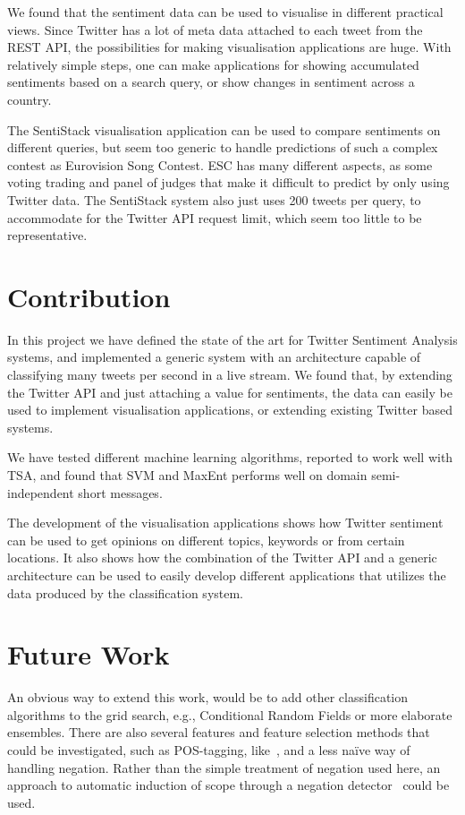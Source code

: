 We found that the sentiment data can be used to visualise in different practical views. Since Twitter has a lot of meta data attached to each tweet from the REST API, the possibilities for making visualisation applications are huge. With relatively simple steps, one can make applications for showing accumulated sentiments based on a search query, or show changes in sentiment across a country.

The SentiStack visualisation application can be used to compare sentiments on different queries, but seem too generic to handle predictions of such a complex contest as Eurovision Song Contest. ESC has many different aspects, as some voting trading and panel of judges that make it difficult to predict by only using Twitter data. The SentiStack system also just uses 200 tweets per query, to accommodate for the Twitter API request limit, which seem too little to be representative.

\section{Contribution}

In this project we have defined the state of the art for Twitter Sentiment Analysis systems, and implemented a generic system with an architecture capable of classifying many tweets per second in a live stream. We found that, by extending the Twitter API and just attaching a value for sentiments, the data can easily be used to implement visualisation applications, or extending existing Twitter based systems. 

We have tested different machine learning algorithms, reported to work well with TSA, and found that SVM and MaxEnt performs well on domain semi-independent short messages.

The development of the visualisation applications shows how Twitter sentiment can be used to get opinions on different topics, keywords or from certain locations. It also shows how the combination of the Twitter API and a generic architecture can be used to easily develop different applications that utilizes the data produced by the classification system.

\section{Future Work}

An obvious way to extend this work, would be to add other classification algorithms to the grid search, e.g., Conditional Random Fields or more elaborate ensembles. There are also several
features and feature selection methods that could be investigated, such as POS-tagging, like~\cite{article:pak}, and a less na\"{i}ve way of handling negation. Rather than the simple treatment of negation used here, an approach to automatic induction of scope through a negation detector~\citep{CouncillEA:10} could be used.

